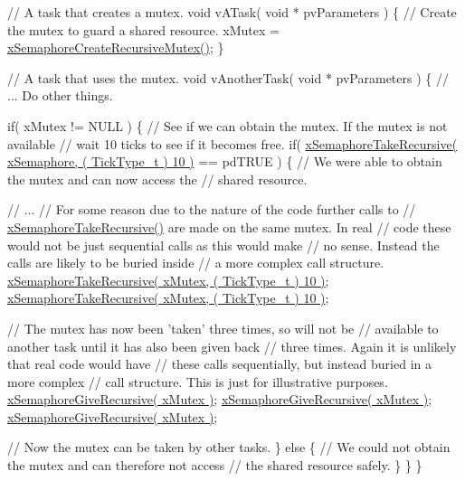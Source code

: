 \begin{DoxyPre}// A task that creates a mutex.
void vATask( void * pvParameters )
\{
   // Create the mutex to guard a shared resource.
   xMutex = \hyperlink{semphr_8h_a1bbc843be5a41ea83d2693b2189fc0f8}{xSemaphoreCreateRecursiveMutex()};
\}\end{DoxyPre}



\begin{DoxyPre}// A task that uses the mutex.
void vAnotherTask( void * pvParameters )
\{
   // ... Do other things.\end{DoxyPre}



\begin{DoxyPre}   if( xMutex != NULL )
   \{
       // See if we can obtain the mutex.  If the mutex is not available
       // wait 10 ticks to see if it becomes free.
       if( \hyperlink{semphr_8h_ad395f4bba51eea6af3397d72bc079e4d}{xSemaphoreTakeRecursive( xSemaphore, ( TickType\_t ) 10 )} == pdTRUE )
       \{
           // We were able to obtain the mutex and can now access the
           // shared resource.\end{DoxyPre}



\begin{DoxyPre}           // ...
           // For some reason due to the nature of the code further calls to
        // \hyperlink{semphr_8h_ad395f4bba51eea6af3397d72bc079e4d}{xSemaphoreTakeRecursive()} are made on the same mutex.  In real
        // code these would not be just sequential calls as this would make
        // no sense.  Instead the calls are likely to be buried inside
        // a more complex call structure.
           \hyperlink{semphr_8h_ad395f4bba51eea6af3397d72bc079e4d}{xSemaphoreTakeRecursive( xMutex, ( TickType\_t ) 10 )};
           \hyperlink{semphr_8h_ad395f4bba51eea6af3397d72bc079e4d}{xSemaphoreTakeRecursive( xMutex, ( TickType\_t ) 10 )};\end{DoxyPre}



\begin{DoxyPre}           // The mutex has now been 'taken' three times, so will not be
        // available to another task until it has also been given back
        // three times.  Again it is unlikely that real code would have
        // these calls sequentially, but instead buried in a more complex
        // call structure.  This is just for illustrative purposes.
           \hyperlink{semphr_8h_a398d66b17856c22dd49d39aaac42f105}{xSemaphoreGiveRecursive( xMutex )};
        \hyperlink{semphr_8h_a398d66b17856c22dd49d39aaac42f105}{xSemaphoreGiveRecursive( xMutex )};
        \hyperlink{semphr_8h_a398d66b17856c22dd49d39aaac42f105}{xSemaphoreGiveRecursive( xMutex )};\end{DoxyPre}



\begin{DoxyPre}        // Now the mutex can be taken by other tasks.
       \}
       else
       \{
           // We could not obtain the mutex and can therefore not access
           // the shared resource safely.
       \}
   \}
\}
\end{DoxyPre}
 